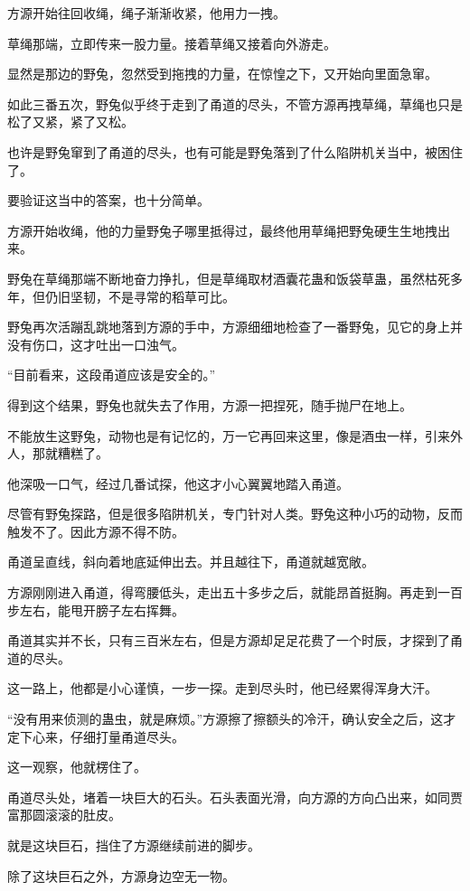 \begin{this_body}
方源开始往回收绳，绳子渐渐收紧，他用力一拽。

草绳那端，立即传来一股力量。接着草绳又接着向外游走。

显然是那边的野兔，忽然受到拖拽的力量，在惊惶之下，又开始向里面急窜。

如此三番五次，野兔似乎终于走到了甬道的尽头，不管方源再拽草绳，草绳也只是松了又紧，紧了又松。

也许是野兔窜到了甬道的尽头，也有可能是野兔落到了什么陷阱机关当中，被困住了。

要验证这当中的答案，也十分简单。

方源开始收绳，他的力量野兔子哪里抵得过，最终他用草绳把野兔硬生生地拽出来。

野兔在草绳那端不断地奋力挣扎，但是草绳取材酒囊花蛊和饭袋草蛊，虽然枯死多年，但仍旧坚韧，不是寻常的稻草可比。

野兔再次活蹦乱跳地落到方源的手中，方源细细地检查了一番野兔，见它的身上并没有伤口，这才吐出一口浊气。

“目前看来，这段甬道应该是安全的。”

得到这个结果，野兔也就失去了作用，方源一把捏死，随手抛尸在地上。

不能放生这野兔，动物也是有记忆的，万一它再回来这里，像是酒虫一样，引来外人，那就糟糕了。

他深吸一口气，经过几番试探，他这才小心翼翼地踏入甬道。

尽管有野兔探路，但是很多陷阱机关，专门针对人类。野兔这种小巧的动物，反而触发不了。因此方源不得不防。

甬道呈直线，斜向着地底延伸出去。并且越往下，甬道就越宽敞。

方源刚刚进入甬道，得弯腰低头，走出五十多步之后，就能昂首挺胸。再走到一百步左右，能甩开膀子左右挥舞。

甬道其实并不长，只有三百米左右，但是方源却足足花费了一个时辰，才探到了甬道的尽头。

这一路上，他都是小心谨慎，一步一探。走到尽头时，他已经累得浑身大汗。

“没有用来侦测的蛊虫，就是麻烦。”方源擦了擦额头的冷汗，确认安全之后，这才定下心来，仔细打量甬道尽头。

这一观察，他就楞住了。

甬道尽头处，堵着一块巨大的石头。石头表面光滑，向方源的方向凸出来，如同贾富那圆滚滚的肚皮。

就是这块巨石，挡住了方源继续前进的脚步。

除了这块巨石之外，方源身边空无一物。


\end{this_body}
